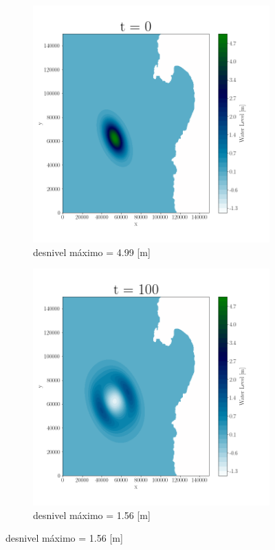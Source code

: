 
\begin{figure}[H]
\centering
\begin{subfigure}[b]{.4\linewidth}
\includegraphics[width=\linewidth]{Figures/Plots/Antofa1.png}
\caption{desnivel máximo = 4.99 [m]}
\end{subfigure}
\begin{subfigure}[b]{.4\linewidth}
\includegraphics[width=\linewidth]{Figures/Plots/Antofa2.png}
\caption{desnivel máximo = 1.56 [m]}
\end{subfigure}


\end{figure}
